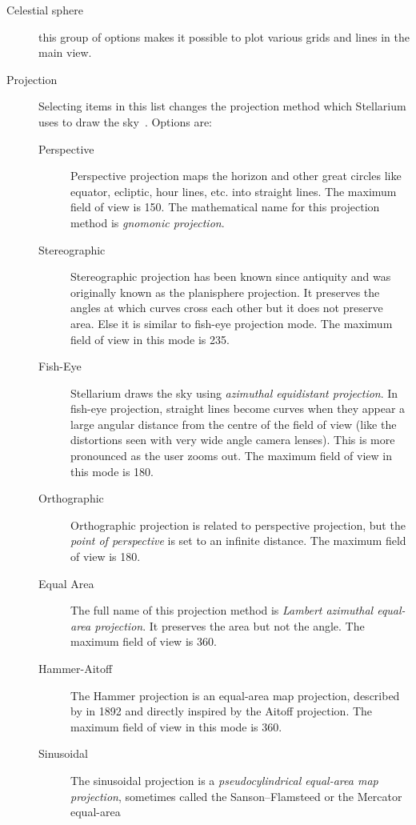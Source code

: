 \begin{description}
\item[Celestial sphere] this group of options makes it possible to
  plot various grids and lines in the main view.
\item[Projection] Selecting items in this list changes the
  projection method which Stellarium uses to draw the sky~\cite{Snyder:MapProjections}. Options are:

  \begin{description}
  \item[Perspective] Perspective projection maps the horizon and other
    great circles like equator, ecliptic, hour lines, etc. into
    straight lines. The maximum field of view is 150\degree. The
    mathematical name for this projection method is \emph{gnomonic
      projection}.
  \item[Stereographic] Stereographic projection has been known since
    antiquity and was originally known as the planisphere
    projection. It preserves the angles at which curves cross each
    other but it does not preserve area. Else it is similar to
    fish-eye projection mode. The maximum field of view in this mode
    is 235\degree.
  \item[Fish-Eye] Stellarium draws the sky using \emph{azimuthal
    equidistant projection}. In fish-eye projection, straight lines
    become curves when they appear a large angular distance from the
    centre of the field of view (like the distortions seen with very
    wide angle camera lenses). This is more pronounced as the user zooms
    out. The maximum field of view in this mode is 180\degree.
  \item[Orthographic] Orthographic projection is related to
    perspective projection, but the \emph{point of perspective} is set
    to an infinite distance. The maximum field of view is 180\degree.
  \item[Equal Area] The full name of this projection method is
    \emph{Lambert azimuthal equal-area projection}. It preserves the
    area but not the angle. The maximum field of view is 360\degree.
  \item[Hammer-Aitoff] The Hammer projection is an equal-area map
    projection, described by  in 1892 and directly inspired
    by the Aitoff projection. The maximum field of view in this mode is
    360\degree.
  \item[Sinusoidal] The sinusoidal projection is a
    \emph{pseudocylindrical equal-area map projection}, sometimes
    called the Sanson--Flamsteed or the Mercator equal-area

\end{description}
\end{description}
